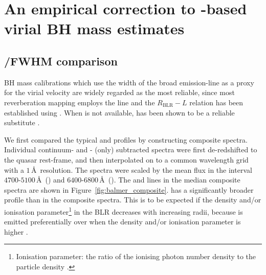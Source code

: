 \section{An empirical correction to -based virial BH mass estimates}

\subsection{\hans/\hb FWHM comparison}
\label{sec:hahbcomparison}

BH mass calibrations which use the width of the broad \hb emission-line as a proxy for the virial velocity are widely regarded as the most reliable, since most reverberation mapping employs the \hb line and the $R_{\text{BLR}}-L$ relation has been established using \hbns.
When \hb is not available, \ha has been shown to be a reliable substitute \citep[e.g.][]{greene05b,shen11,shen12}.

We first compared the typical \ha and \hb profiles by constructing composite spectra.
Individual continuum- and - (\hb only) subtracted spectra were first de-redshifted to the quasar rest-frame, and then interpolated on to a common wavelength grid with a $1$\,\AA\, resolution.
The spectra were scaled by the mean flux in the interval $4700$-$5100$\,\AA\, (\hbns) and $6400$-$6800$\,\AA\, (\hans).
The \ha and \hb lines in the median composite spectra are shown in Figure~\ref{fig:balmer_composite}.
\hb has a significantly broader profile than \ha in the composite spectra.
This is to be expected if the density and/or ionisation parameter\footnote{Ionisation parameter: the ratio of the ionising photon number density to the particle density \citep[e.g.][]{peterson97}.} in the BLR decreases with increasing radii, because \hb is emitted preferentially over \ha when the density and/or ionisation parameter is higher \citep[e.g.][]{osterbrock89}.

